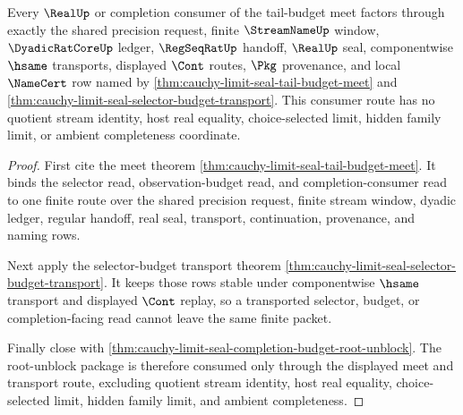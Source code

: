 \begin{theorem}
\label{thm:cauchy-limit-seal-tail-budget-consumer-normal-form}
Every $\RealUp$ or completion consumer of the tail-budget meet factors through exactly the shared precision request, finite $\StreamNameUp$ window, $\DyadicRatCoreUp$ ledger, $\RegSeqRatUp$ handoff, $\RealUp$ seal, componentwise $\hsame$ transports, displayed $\Cont$ routes, $\Pkg$ provenance, and local $\NameCert$ row named by \autoref{thm:cauchy-limit-seal-tail-budget-meet} and \autoref{thm:cauchy-limit-seal-selector-budget-transport}. This consumer route has no quotient stream identity, host real equality, choice-selected limit, hidden family limit, or ambient completeness coordinate.
\end{theorem}
\begin{proof}
First cite the meet theorem \autoref{thm:cauchy-limit-seal-tail-budget-meet}. It binds the selector read, observation-budget read, and completion-consumer read to one finite route over the shared precision request, finite stream window, dyadic ledger, regular handoff, real seal, transport, continuation, provenance, and naming rows.

Next apply the selector-budget transport theorem \autoref{thm:cauchy-limit-seal-selector-budget-transport}. It keeps those rows stable under componentwise $\hsame$ transport and displayed $\Cont$ replay, so a transported selector, budget, or completion-facing read cannot leave the same finite packet.

Finally close with \autoref{thm:cauchy-limit-seal-completion-budget-root-unblock}. The root-unblock package is therefore consumed only through the displayed meet and transport route, excluding quotient stream identity, host real equality, choice-selected limit, hidden family limit, and ambient completeness.
\end{proof}

